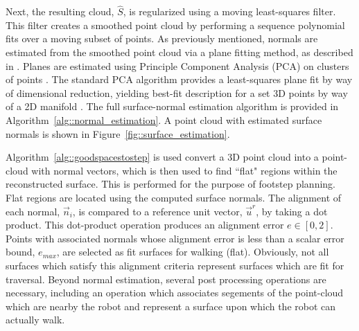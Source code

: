			Next, the resulting cloud, $\hat{S}$, is regularized using a moving least-squares filter. This filter creates a smoothed point cloud by performing a sequence polynomial fits over a moving subset of points. As previously mentioned, normals are estimated from the smoothed point cloud via a plane fitting method, as described in \cite{Mitra2003}. Planes are estimated using Principle Component Analysis (PCA) on clusters of points \cite{Castillo2013}. The standard PCA algorithm provides a least-squares plane fit by way of dimensional reduction, yielding best-fit description for a set 3D points by way of a 2D manifold \cite{Pearson1901}. The full surface-normal estimation algorithm is provided in Algorithm~\ref{alg::normal_estimation}. A point cloud with estimated surface normals is shown in Figure~\ref{fig::surface_estimation}.

			Algorithm~\ref{alg::goodspacestostep} is used convert a 3D point cloud into a point-cloud with normal vectors, which is then used to find ``flat" regions within the reconstructed surface. This is performed for the purpose of footstep planning. Flat regions are located using the computed surface normals. The alignment of each \Ith normal, $\vec{n}_{i}$, is compared to a reference unit vector, $\vec{u}^{r}$, by taking a dot product. This dot-product operation produces an alignment error $e\in[0,2]$. Points with associated normals whose alignment error is less than a scalar error bound, $e_{max}$, are selected as fit surfaces for walking (\IE flat). Obviously, not all surfaces which satisfy this alignment criteria represent surfaces which are fit for traversal. Beyond normal estimation, several post processing operations are necessary, including an operation which associates segements of the point-cloud which are nearby the robot and represent a surface upon which the robot can actually walk. 

